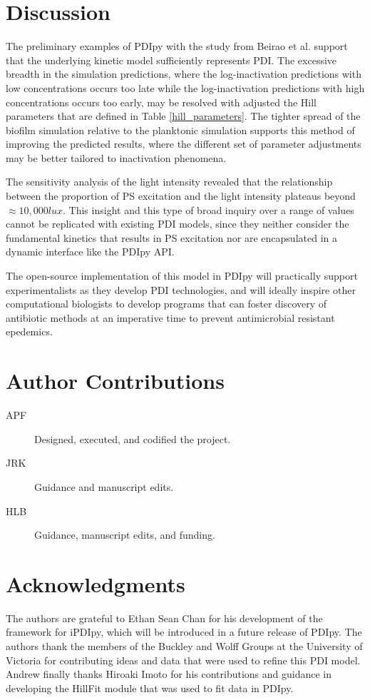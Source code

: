 \section{Discussion}
The preliminary examples of PDIpy with the study from Beirao et al. support that the underlying kinetic model sufficiently represents PDI. The excessive breadth in the simulation predictions, where the log-inactivation predictions with low concentrations occurs too late while the log-inactivation predictions with high concentrations occurs too early, may be resolved with adjusted the Hill parameters that are defined in Table \ref{hill_parameters}. The tighter spread of the biofilm simulation relative to the planktonic simulation supports this method of improving the predicted results, where the different set of parameter adjustments may be better tailored to inactivation phenomena. 

The sensitivity analysis of the light intensity revealed that the relationship between the proportion of PS excitation and the light intensity plateaus beyond $\approx 10,000 lux$. This insight and this type of broad inquiry over a range of values cannot be replicated with existing PDI models, since they neither consider the fundamental kinetics that results in PS excitation nor are encapsulated in a dynamic interface like the PDIpy API.  

The open-source implementation of this model in PDIpy will practically support experimentalists as they develop PDI technologies, and will ideally inspire other computational biologists to develop programs that can foster discovery of antibiotic methods at an imperative time to prevent antimicrobial resistant epedemics.   


\section{Author Contributions}
\begin{description}
    \item[APF] Designed, executed, and codified the project.
    \item[JRK] Guidance and manuscript edits.
    \item[HLB] Guidance, manuscript edits, and funding.
\end{description}

\section{Acknowledgments}

The authors are grateful to Ethan Sean Chan for his development of the framework for iPDIpy, which will be introduced in a future release of PDIpy. The authors thank the members of the Buckley and Wolff Groups at the University of Victoria for contributing ideas and data that were used to refine this PDI model. Andrew finally thanks Hiroaki Imoto for his contributions and guidance in developing the HillFit module that was used to fit data in PDIpy.